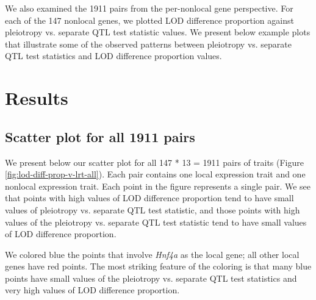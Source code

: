 \documentclass{article}
\begin{document}
We also examined the 1911 pairs from the per-nonlocal gene perspective. For each of the 147 nonlocal genes, we plotted LOD difference proportion against pleiotropy vs. separate QTL test statistic values. We present below example plots that illustrate some of the observed patterns between pleiotropy vs. separate QTL test statistics and LOD difference proportion values.


\section{Results}

\subsection{Scatter plot for all 1911 pairs}

We present below our scatter plot for all 147 * 13 = 1911 pairs of traits (Figure \ref{fig:lod-diff-prop-v-lrt-all}). Each pair contains one local expression trait and one nonlocal expression trait. Each point in the figure represents a single pair. We see that points with high values of LOD difference proportion tend to have small values of pleiotropy vs. separate QTL test statistic, and those points with high values of the pleiotropy vs. separate QTL test statistic tend to have small values of LOD difference proportion. 

We colored blue the points that involve \emph{Hnf4a} as the local gene; all other local genes have red points. The most striking feature of the coloring is that many blue points have small values of the pleiotropy vs. separate QTL test statistics and very high values of LOD difference proportion. 
\end{document}
